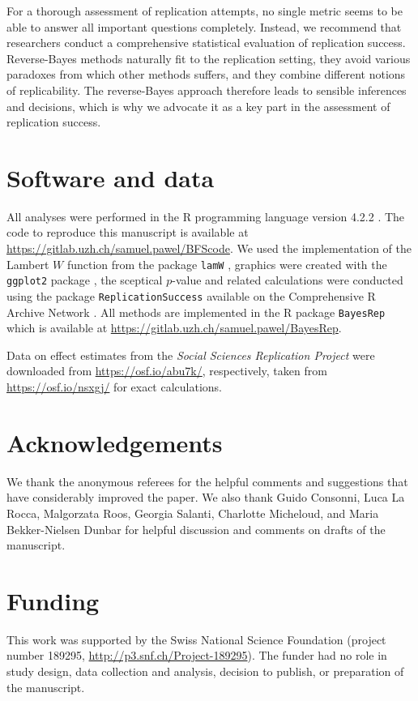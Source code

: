 For a thorough assessment of replication attempts, no single metric seems to be
able to answer all important questions completely. Instead, we recommend that
researchers conduct a comprehensive statistical evaluation of replication
success. Reverse-Bayes methods naturally fit to the replication setting, they
avoid various paradoxes from which other methods suffers, and they combine
different notions of replicability. The reverse-Bayes approach therefore leads
to sensible inferences and decisions, which is why we advocate it as a key part
in the assessment of replication success.

\section*{Software and data}
All analyses were performed in the R programming language version
4.2.2 \citep{R}. The code to
reproduce this manuscript is available at
\url{https://gitlab.uzh.ch/samuel.pawel/BFScode}. We used the implementation of
the Lambert $W$ function from the package \texttt{lamW} \citep{Adler2015},
graphics were created with the \texttt{ggplot2} package \citep{Wickham2016}, the
sceptical $p$-value and related calculations were conducted using the package
\texttt{ReplicationSuccess} available on the Comprehensive R Archive Network
\citep{Held2020}. All methods are implemented in the R package \texttt{BayesRep}
which is available at \url{https://gitlab.uzh.ch/samuel.pawel/BayesRep}.

Data on effect estimates from the \emph{Social Sciences Replication Project}
\citep{Camerer2018} were downloaded from \url{https://osf.io/abu7k/},
respectively, taken from \url{https://osf.io/nsxgj/} for exact calculations.

\section*{Acknowledgements}
We thank the anonymous referees for the helpful comments and suggestions that
have considerably improved the paper. We also thank Guido Consonni, Luca La
Rocca, Malgorzata Roos, Georgia Salanti, Charlotte Micheloud, and Maria
Bekker-Nielsen Dunbar for helpful discussion and comments on drafts of the
manuscript.

\section*{Funding}
This work was supported by the Swiss National Science Foundation (project number
189295, \url{http://p3.snf.ch/Project-189295}). The funder had no role in study
design, data collection and analysis, decision to publish, or preparation of the
manuscript.

